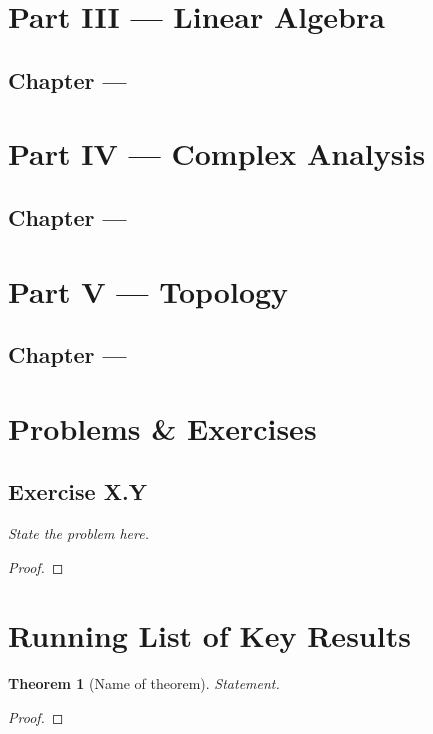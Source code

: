 \documentclass[11pt, letterpaper]{article}
\newtheorem{theorem}{Theorem}[section]
\theoremstyle{definition}
\theoremstyle{remark}
\begin{document}
\section{Part III — Linear Algebra}

\subsection{Chapter — }


\section{Part IV — Complex Analysis}

\subsection{Chapter — }


\section{Part V — Topology}

\subsection{Chapter — }


\section{Problems \& Exercises}

\subsection*{Exercise X.Y}
\textit{State the problem here.}

\begin{proof}
\end{proof}


\section{Running List of Key Results}

\begin{theorem}[Name of theorem]
  Statement.
\end{theorem}

\begin{proof}
\end{proof}
\end{document}
